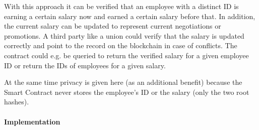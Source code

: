 With this approach it can be verified that an employee with a distinct ID is earning a certain salary now and earned a certain salary before that. In addition, the current salary can be updated to represent current negotiations or promotions. A third party like a union could verify that the salary is updated correctly and point to the record on the blockchain in case of conflicts. The contract could e.g. be queried to return the verified salary for a given employee ID or return the IDs of employees for a given salary.

At the same time privacy is given here (as an additional benefit) because the Smart Contract never stores the employee’s ID or the salary (only the two root hashes).


\paragraph{Implementation}
